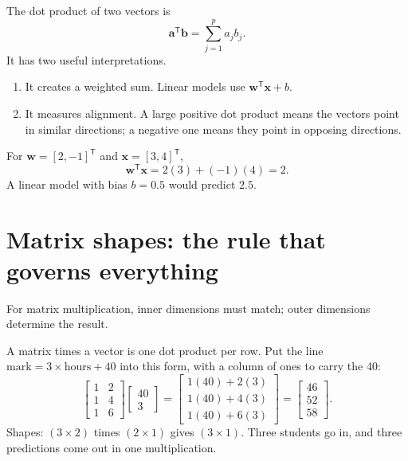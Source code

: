 The dot product of two vectors is
\[
  \bm{a}^{\mathsf T}\bm{b}=\sum_{j=1}^{p}a_jb_j.
\]
It has two useful interpretations.

\begin{enumerate}
  \item It creates a weighted sum. Linear models use $\bm{w}^{\mathsf T}\bm{x}+b$.
  \item It measures alignment. A large positive dot product means the vectors point in similar directions; a negative one means they point in opposing directions.
\end{enumerate}

\begin{workedexample}
For $\bm{w}=[2,-1]^{\mathsf T}$ and $\bm{x}=[3,4]^{\mathsf T}$,
\[
\bm{w}^{\mathsf T}\bm{x}=2(3)+(-1)(4)=2.
\]
A linear model with bias $b=0.5$ would predict $2.5$.
\end{workedexample}

\section{Matrix shapes: the rule that governs everything}

For matrix multiplication, inner dimensions must match; outer dimensions determine the result.

\begin{workedexample}
A matrix times a vector is one dot product per row. Put the line $\text{mark}=3\times\text{hours}+40$ into this form, with a column of ones to carry the 40:
\[
\begin{bmatrix}1&2\\1&4\\1&6\end{bmatrix}
\begin{bmatrix}40\\3\end{bmatrix}
=
\begin{bmatrix}1(40)+2(3)\\1(40)+4(3)\\1(40)+6(3)\end{bmatrix}
=
\begin{bmatrix}46\\52\\58\end{bmatrix}.
\]
Shapes: $(3\times2)$ times $(2\times1)$ gives $(3\times1)$. Three students go in, and three predictions come out in one multiplication.
\end{workedexample}

